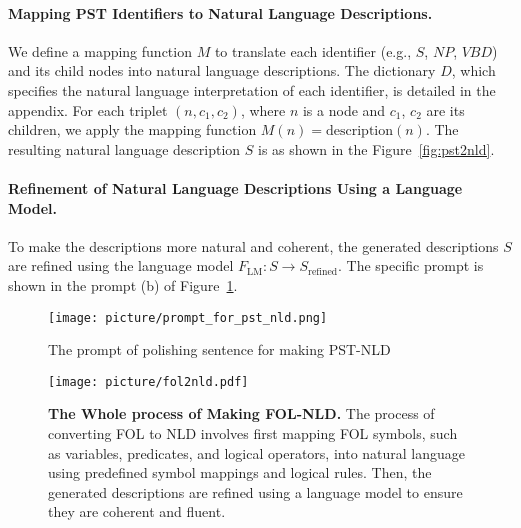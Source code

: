 \paragraph{Mapping PST Identifiers to Natural Language Descriptions.}

    We define a mapping function \( M \) to translate each identifier (e.g., \( S \), \( NP \), \( VBD \)) and its child nodes into natural language descriptions. The dictionary \( D \), which specifies the natural language interpretation of each identifier, is detailed in the appendix. For each triplet \( (n, c_1, c_2) \), where \( n \) is a node and \( c_1 \), \( c_2 \) are its children, we apply the mapping function \( M(n) = \text{description}(n) \). The resulting natural language description \( S \) is as shown in the Figure~\ref{fig:pst2nld}.
    
\paragraph{Refinement of Natural Language Descriptions Using a Language Model.}

    To make the descriptions more natural and coherent, the generated descriptions \( S \) are refined using the language model \( F_{\text{LM}}: S \rightarrow S_{\text{refined}} \). The specific prompt is shown in the prompt (b) of Figure~\ref{fig:pstnld_prompt}. 
  
\begin{figure}[ht]
\centering
\vspace{0in}
\texttt{[image: picture/prompt\_for\_pst\_nld.png]}
\caption{The prompt of polishing sentence for making PST-NLD}
\label{fig:pstnld_prompt}
\vspace{-0.1in}
\end{figure}

\begin{figure}
\centering
\vspace{0.1in}
\texttt{[image: picture/fol2nld.pdf]}
\vspace{0.1in}
\caption{\textbf{The Whole process of Making FOL-NLD.} The process of converting FOL to NLD involves first mapping FOL symbols, such as variables, predicates, and logical operators, into natural language using predefined symbol mappings and logical rules. Then, the generated descriptions are refined using a language model to ensure they are coherent and fluent.}
\label{fig:fol2nld}
\vspace{0.1in}
\end{figure}

